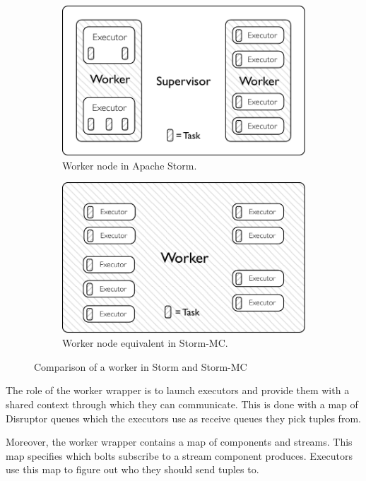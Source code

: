 \documentclass[bsc,logo,frontabs,twoside,singlespacing,normalheadings,parskip]{infthesis}\usepackage[]{graphicx}\usepackage[]{color}
\begin{document}
\begin{figure}[!htb]
\centering
\begin{subfigure}{.5\textwidth}
  \centering
  \includegraphics[width=0.95\linewidth]{pdf/distributed_worker.pdf}
  \caption{Worker node in Apache Storm.}
  \label{fig:comparison1}
\end{subfigure}\begin{subfigure}{.5\textwidth}
  \centering
  \includegraphics[width=0.95\linewidth]{pdf/local_worker.pdf}
  \caption{Worker node equivalent in Storm-MC.}
  \label{fig:comparison2}
\end{subfigure}
\caption{Comparison of a worker in Storm and Storm-MC}
\label{fig:comparison}
\end{figure}

The role of the worker wrapper is to launch executors and provide them with a shared context through which they can communicate. This is done with a map of Disruptor queues which the executors use as receive queues they pick tuples from.

Moreover, the worker wrapper contains a map of components and streams. This map specifies which bolts subscribe to a stream component produces. Executors use this map to figure out who they should send tuples to.
\end{document}
